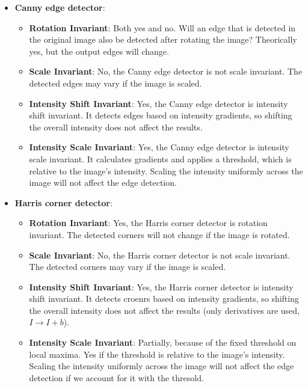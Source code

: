 \documentclass{article}
\begin{document}
\begin{itemize}
    \item \textbf{Canny edge detector}:
    \begin{itemize} 
        \item \textbf{Rotation Invariant}: Both yes and no. Will an edge that is detected in the original image also be detected after rotating the image? Theorically yes, but the output edges will change.
        \item \textbf{Scale Invariant}: No, the Canny edge detector is not scale invariant. The detected edges may vary if the image is scaled.
        \item \textbf{Intensity Shift Invariant}: Yes, the Canny edge detector is intensity shift invariant. It detects edges based on intensity gradients, so shifting the overall intensity does not affect the results.
        \item \textbf{Intensity Scale Invariant}: Yes, the Canny edge detector is intensity scale invariant. It calculates gradients and applies a threshold, which is relative to the image's intensity. Scaling the intensity uniformly across the image will not affect the edge detection.
    \end{itemize}

    \item \textbf{Harris corner detector}:
    \begin{itemize}
        \item \textbf{Rotation Invariant}: Yes, the Harris corner detector is rotation invariant. The detected corners will not change if the image is rotated.
        \item \textbf{Scale Invariant}: No, the Harris corner detector is not scale invariant. The detected corners may vary if the image is scaled.
        \item \textbf{Intensity Shift Invariant}: Yes, the Harris corner detector is intensity shift invariant. It detects croenrs based on intensity gradients, so shifting the overall intensity does not affect the results (only derivatives are used, $I \rightarrow I + b$).
        \item \textbf{Intensity Scale Invariant}: Partially, because of the fixed threshold on local maxima. Yes if the threshold is relative to the image's intensity. Scaling the intensity uniformly across the image will not affect the edge detection if we account for it with the thresold.
    \end{itemize}


\end{itemize}
\end{document}
